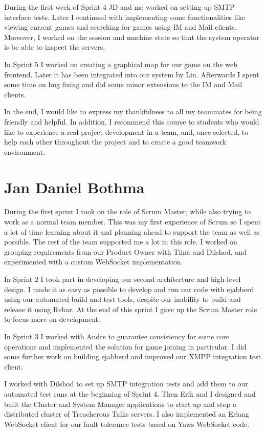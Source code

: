 \documentclass[11pt,a4paper]{report}
\begin{document}
During the first week of Sprint 4 JD and me worked on setting up SMTP
interface tests. Later I continued with implementing some functionalities like
viewing current games and searching for games using IM and Mail clients.
Moreover, I worked on the session and machine state so that the system operator
is be able to inspect the servers.

In Sprint 5 I worked on creating a graphical map for our game on the web
frontend. Later it has been integrated into our system by Lin. Afterwards I
spent some time on bug fixing and did some minor extensions to the IM and Mail
clients.

In the end, I would like to express my thankfulness to all my teammates for
being friendly and helpful. In addition, I recommend this course to students
who would like to experience a real project development in a team, and, once
selected, to help each other throughout the project and to create a good
teamwork environment.

\section{Jan Daniel Bothma}
During the first sprint I took on the role of Scrum Master, while also trying to
work as a normal team member. This was my first experience of Scrum so I spent a
lot of time learning about it and planning ahead to support the team as well as
possible. The rest of the team supported me a lot in this role.
I worked on grouping requirements from our Product Owner with Tiina
and Dilshod, and experimented with a custom WebSocket implementation.

In Sprint 2 I took part in developing our second architecture and high level
design. I made it as easy as possible to develop and run our code with ejabberd
using our automated build and test tools, despite our inability to build and
release it using Rebar. At the end of this sprint I gave up the Scrum Master
role to focus more on development.

In Sprint 3 I worked with Andre to guarantee consistency for some core
operations and implemented the solution for game joining in particular. I did
some further work on building ejabberd and improved our XMPP integration test
client.

I worked with Dilshod to set up SMTP integration tests and add them to our
automated test runs at the beginning of Sprint 4. Then Erik and I designed and
built the Cluster and System Manager applications to start up and stop a
distributed cluster of Treacherous Talks servers. I also implemented an Erlang
WebSocket client for our fault tolerance tests based on Yaws WebSocket code.
\end{document}
